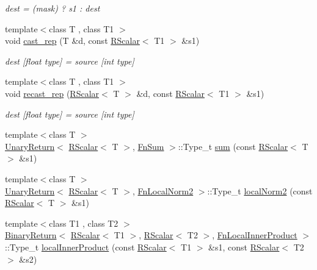 \begin{DoxyCompactItemize}
\begin{DoxyCompactList}\small\item\em dest = (mask) ? s1 \+: dest \end{DoxyCompactList}\item 
{\footnotesize template$<$class T , class T1 $>$ }\\void \mbox{\hyperlink{group__rscalar_ga7fc2c1b07bacdd72df1204c120ace7a0}{cast\+\_\+rep}} (T \&d, const \mbox{\hyperlink{classENSEM_1_1RScalar}{R\+Scalar}}$<$ T1 $>$ \&s1)
\begin{DoxyCompactList}\small\item\em dest \mbox{[}float type\mbox{]} = source \mbox{[}int type\mbox{]} \end{DoxyCompactList}\item 
{\footnotesize template$<$class T , class T1 $>$ }\\void \mbox{\hyperlink{group__rscalar_ga1ecb21d4e8fc1e664055d3fa1145f6e9}{recast\+\_\+rep}} (\mbox{\hyperlink{classENSEM_1_1RScalar}{R\+Scalar}}$<$ T $>$ \&d, const \mbox{\hyperlink{classENSEM_1_1RScalar}{R\+Scalar}}$<$ T1 $>$ \&s1)
\begin{DoxyCompactList}\small\item\em dest \mbox{[}float type\mbox{]} = source \mbox{[}int type\mbox{]} \end{DoxyCompactList}\item 
{\footnotesize template$<$class T $>$ }\\\mbox{\hyperlink{structENSEM_1_1UnaryReturn}{Unary\+Return}}$<$ \mbox{\hyperlink{classENSEM_1_1RScalar}{R\+Scalar}}$<$ T $>$, \mbox{\hyperlink{structENSEM_1_1FnSum}{Fn\+Sum}} $>$\+::Type\+\_\+t \mbox{\hyperlink{group__rscalar_ga53401bdacfb693c17335cacfc5e9f6dd}{sum}} (const \mbox{\hyperlink{classENSEM_1_1RScalar}{R\+Scalar}}$<$ T $>$ \&s1)
\item 
{\footnotesize template$<$class T $>$ }\\\mbox{\hyperlink{structENSEM_1_1UnaryReturn}{Unary\+Return}}$<$ \mbox{\hyperlink{classENSEM_1_1RScalar}{R\+Scalar}}$<$ T $>$, \mbox{\hyperlink{structENSEM_1_1FnLocalNorm2}{Fn\+Local\+Norm2}} $>$\+::Type\+\_\+t \mbox{\hyperlink{group__rscalar_ga3ca325ab0808bb3c4b966320b923c213}{local\+Norm2}} (const \mbox{\hyperlink{classENSEM_1_1RScalar}{R\+Scalar}}$<$ T $>$ \&s1)
\item 
{\footnotesize template$<$class T1 , class T2 $>$ }\\\mbox{\hyperlink{structENSEM_1_1BinaryReturn}{Binary\+Return}}$<$ \mbox{\hyperlink{classENSEM_1_1RScalar}{R\+Scalar}}$<$ T1 $>$, \mbox{\hyperlink{classENSEM_1_1RScalar}{R\+Scalar}}$<$ T2 $>$, \mbox{\hyperlink{structENSEM_1_1FnLocalInnerProduct}{Fn\+Local\+Inner\+Product}} $>$\+::Type\+\_\+t \mbox{\hyperlink{group__rscalar_gadd76bb3801e8a4665498325bf9c7f6ae}{local\+Inner\+Product}} (const \mbox{\hyperlink{classENSEM_1_1RScalar}{R\+Scalar}}$<$ T1 $>$ \&s1, const \mbox{\hyperlink{classENSEM_1_1RScalar}{R\+Scalar}}$<$ T2 $>$ \&s2)

\end{DoxyCompactItemize}
